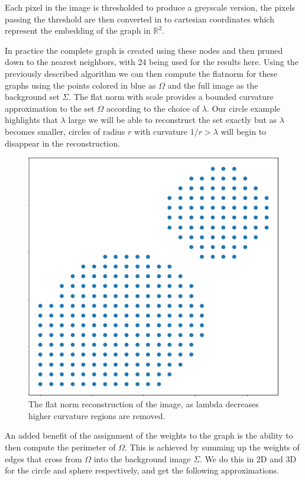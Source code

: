 \documentclass[12pt]{article}
\begin{document}
Each pixel in the image is thresholded to produce a greyscale version, the pixels passing the threshold are then converted in to cartesian coordinates which represent the embedding of the graph in $\mathbb{R}^2$. 

In practice the complete graph is created using these nodes and then pruned down to the nearest neighbors, with 24 being used for the results here. Using the previously described algorithm we can then compute the flatnorm for these graphs using the points colored in blue as $\Omega$ and the full image as the background set $\Sigma$. The flat norm with scale provides a bounded curvature approximation to the set $\Omega$ according to the choice of $\lambda$. Our circle example highlights that $\lambda$ large we will be able to reconstruct the set exactly but as $\lambda$ becomes smaller, circles of radius $r$ with curvature $1 / r > \lambda$ will begin to disappear in the reconstruction.

\begin{figure}[H]
	\centering
	\includegraphics[scale=0.5]{circleslamb.png}
	\caption{The flat norm reconstruction of the image, as lambda decreases higher curvature regions are removed.}
\end{figure}


An added benefit of the assignment of the weights to the graph is the ability to then compute the perimeter of $\Omega$. This is achieved by summing up the weights of edges that cross from $\Omega$ into the background image $\Sigma$. We do this in 2D and 3D for the circle and sphere respectively, and get the following approximations.
\end{document}
